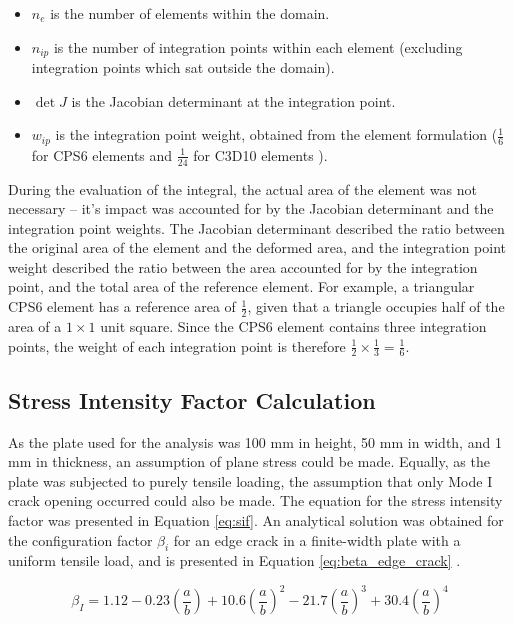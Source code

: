 \begin{itemize}
	\item $n_e$ is the number of elements within the domain.
	\item $n_{ip}$ is the number of integration points within each element (excluding integration points which sat outside the domain).
	\item $\det J$ is the Jacobian determinant at the integration point.
	\item $w_{ip}$ is the integration point weight, obtained from the element formulation ($\frac{1}{6}$ for CPS6 elements and $\frac{1}{24}$ for C3D10 elements \cite{aster_111_nodate}).
\end{itemize}

During the evaluation of the integral, the actual area of the element was not necessary -- it's impact was accounted for by the Jacobian determinant and the integration point weights. The Jacobian determinant described the ratio between the original area of the element and the deformed area, and the integration point weight described the ratio between the area accounted for by the integration point, and the total area of the reference element. For example, a triangular CPS6 element has a reference area of $\frac{1}{2}$, given that a triangle occupies half of the area of a $1 \times 1$ unit square. Since the CPS6 element contains three integration points, the weight of each integration point is therefore $\frac{1}{2} \times \frac{1}{3} = \frac{1}{6}$.

\subsection{Stress Intensity Factor Calculation}

As the plate used for the analysis was 100 mm in height, 50 mm in width, and 1 mm in thickness, an assumption of plane stress could be made. Equally, as the plate was subjected to purely tensile loading, the assumption that only Mode I crack opening occurred could also be made. The equation for the stress intensity factor was presented in Equation \ref{eq:sif}. An analytical solution was obtained for the configuration factor $\beta_{i}$ for an edge crack in a finite-width plate with a uniform tensile load, and is presented in Equation \ref{eq:beta_edge_crack} \cite{yuan_research_2023}.

\begin{equation}\label{eq:beta_edge_crack}
	\beta_I = 1.12 - 0.23 \left(\frac{a}{b}\right) + 10.6 \left(\frac{a}{b}\right)^2 - 21.7 \left(\frac{a}{b}\right)^3 + 30.4 \left(\frac{a}{b}\right)^4
\end{equation}


